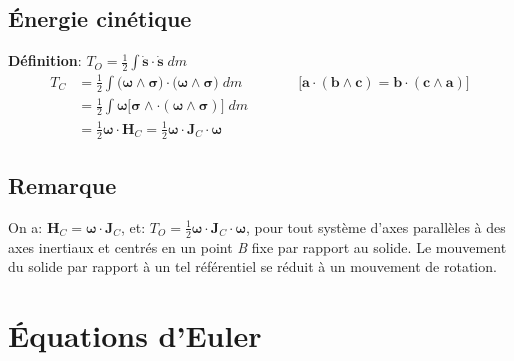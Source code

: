 \documentclass[a4paper]{article}
\begin{document}
\subsection{Énergie cinétique}





\textbf{Définition}: $\displaystyle T_O = \frac{1}{2} \int \dot{\textbf{s}} \cdot \dot{\textbf{s}} \; d m $
\[ \begin{aligned}
T_C &= \frac{1}{2} \int \big( \boldsymbol{\omega} \wedge \boldsymbol{\sigma} \big) \cdot \big( \boldsymbol{\omega} \wedge \boldsymbol{\sigma} \big) \; d m  \qquad \qquad \big[ \textbf{a} \cdot (\textbf{b} \wedge \textbf{c}) = \textbf{b} \cdot (\textbf{c} \wedge \textbf{a}) \big] \\
&= \frac{1}{2} \int \boldsymbol{\omega} \big[ \boldsymbol{\sigma} \wedge \cdot (\boldsymbol{\omega} \wedge \boldsymbol{\sigma}) \big] \; d m \\
&= \frac{1}{2} \boldsymbol{\omega} \cdot \textbf{H}_C = \frac{1}{2} \boldsymbol{\omega} \cdot \textbf{J}_C \cdot \boldsymbol{\omega}
\end{aligned} \]





\subsection{Remarque}





On a: $ \textbf{H}_C = \boldsymbol{\omega} \cdot \textbf{J}_C $, et: $ T_O = \frac{1}{2} \boldsymbol{\omega} \cdot \textbf{J}_C \cdot \boldsymbol{\omega} $, pour tout système d’axes parallèles à des axes inertiaux et centrés en un point \emph{B} fixe par rapport au solide. Le mouvement du solide par rapport à un tel référentiel se réduit à un mouvement de rotation.










\section{Équations d'Euler}
\end{document}
